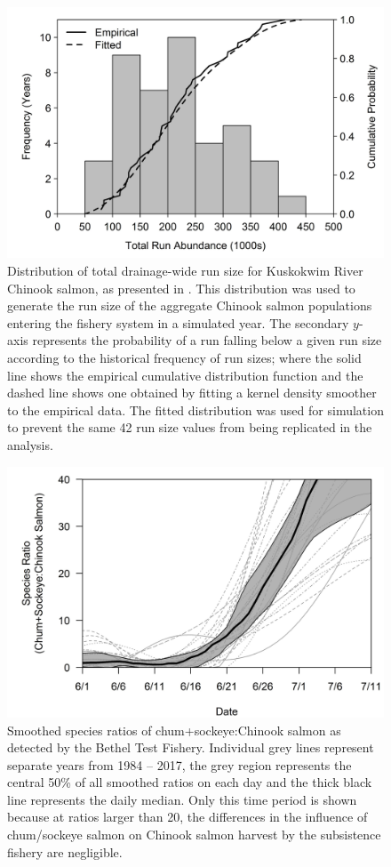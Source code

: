 \documentclass[12pt,]{book}
\theoremstyle{definition}
\theoremstyle{definition}
\theoremstyle{definition}
\theoremstyle{remark}
\begin{document}
\begin{figure}
  \centering
  \includegraphics{img/Ch3/N-plot.jpg}
  \caption{Distribution of total drainage-wide run size for Kuskokwim River Chinook salmon, as presented in \cite{liller-etal-2018}. This distribution was used to generate the run size of the aggregate Chinook salmon populations entering the fishery system in a simulated year. The secondary $y$-axis represents the probability of a run falling below a given run size according to the historical frequency of run sizes; where the solid line shows the empirical cumulative distribution function and the dashed line shows one obtained by fitting a kernel density smoother to the empirical data. The fitted distribution was used for simulation to prevent the same 42 run size values from being replicated in the analysis.}
  \label{fig:N-plot}
\end{figure}

\clearpage

\begin{figure}
  \centering
  \includegraphics{img/Ch3/ratios-plot.jpg}
  \caption{Smoothed species ratios of chum+sockeye:Chinook salmon as detected by the Bethel Test Fishery. Individual grey lines represent separate years from 1984 -- 2017, the grey region represents the central 50\% of all smoothed ratios on each day and the thick black line represents the daily median. Only this time period is shown because at ratios larger than 20, the differences in the influence of chum/sockeye salmon on Chinook salmon harvest by the subsistence fishery are negligible.}
  \label{fig:ratios-plot}
\end{figure}
\end{document}
